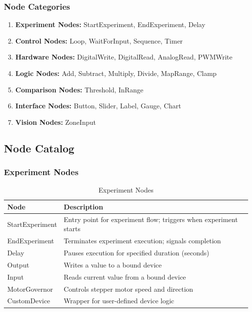 \documentclass[11pt,a4paper]{article}
\begin{document}
\subsubsection{Node Categories}

\begin{enumerate}    \item \textbf{Experiment Nodes:} StartExperiment, EndExperiment, Delay
    \item \textbf{Control Nodes:} Loop, WaitForInput, Sequence, Timer
    \item \textbf{Hardware Nodes:} DigitalWrite, DigitalRead, AnalogRead, PWMWrite
    \item \textbf{Logic Nodes:} Add, Subtract, Multiply, Divide, MapRange, Clamp
    \item \textbf{Comparison Nodes:} Threshold, InRange
    \item \textbf{Interface Nodes:} Button, Slider, Label, Gauge, Chart
    \item \textbf{Vision Nodes:} ZoneInput
\end{enumerate}

\subsection{Node Catalog}

\subsubsection{Experiment Nodes}

\begin{table}[H]
\centering
\begin{tabular}{@{}lp{8cm}@{}}
\toprule
\textbf{Node} & \textbf{Description} \\
\midrule
StartExperiment & Entry point for experiment flow; triggers when experiment starts \\
EndExperiment & Terminates experiment execution; signals completion \\
Delay & Pauses execution for specified duration (seconds) \\
Output & Writes a value to a bound device \\
Input & Reads current value from a bound device \\
MotorGovernor & Controls stepper motor speed and direction \\
CustomDevice & Wrapper for user-defined device logic \\
\bottomrule
\end{tabular}
\caption{Experiment Nodes}
\end{table}
\end{document}

